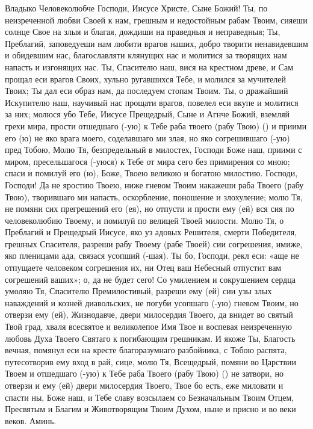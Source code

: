 \begin{mymulticols}
 


Владыко Человеколюбче Господи, Иисусе Христе, Сыне Божий! Ты, по неизреченной любви Своей к нам, грешным и недостойным рабам Твоим, сияеши солнце Свое на злыя и благая, дождиши на праведныя и неправедныя; Ты, Преблагий, заповедуеши нам любити врагов наших, добро творити ненавидевшим и обидевшим нас, благославляти клянущих нас и молитися за творящих нам напасть и изгонящих нас. Ты, Спасителю наш, вися на крестном древе, и Сам прощал еси врагов Своих, хульно ругавшихся Тебе, и молился за мучителей Твоих; Ты дал еси образ нам, да последуем стопам Твоим. Ты, о дражайший Искупителю наш, научивый нас прощати врагов, повелел еси вкупе и молитися за них; молюся убо Тебе, Иисусе Прещедрый, Сыне и Агнче Божий, вземляй грехи мира, прости отшедшаго (-ую) к Тебе раба твоего (рабу Твою) () и приими его (ю) не яко врага моего, соделавшаго ми злая, но яко согрешившаго (-ую) пред Тобою, Молю Тя, безпредельный в милостех, Господи Боже наш, приими с миром, пресельшагося (-уюся) к Тебе от мира сего без примирения со мною; спаси и помилуй его (ю), Боже, Твоею великою и богатою милостию. Господи, Господи! Да не яростию Твоею, ниже гневом Твоим накажеши раба Твоего (рабу Твою), творившаго ми напасть, оскорбление, поношение и злохуление; молю Тя, не помяни сих прегрешений его (ея), но отпусти и прости ему (ей) вся сия по человеколюбию Твоему, и помилуй по велицей Твоей милости. Молю Тя, о Преблагий и Прещедрый Иисусе, яко уз адовых Решителя, смерти Победителя, грешных Спасителя, разреши рабу Твоему (рабе Твоей) сии согрешения, имиже, яко пленицами ада, связася усопший (-шая). Ты бо, Господи, рекл еси: «аще не отпущаете человеком согрешения их, ни Отец ваш Небесный отпустит вам согрешений ваших»; о, да не будет сего! Со умилением и сокрушением сердца умоляю Тя, Спасителю Премилостивый, разреши ему (ей) сии узы злых наваждений и козней диавольских, не погуби усопшаго (-ую) гневом Твоим, но отверзи ему (ей), Жизнодавче, двери милосердия Твоего, да внидет во святый Твой град, хваля всесвятое и великолепое Имя Твое и воспевая неизреченную любовь Духа Твоего Святаго к погибающим грешникам. И якоже Ты, Благость вечная, помянул еси на кресте благоразумнаго разбойника, с Тобою распята, путесотворив ему вход в рай, сице, молю Тя, Всещедрый, помяни во Царствии Твоем и отшедшаго (-ую) к Тебе раба Твоего (рабу Твою) () не затвори, но отверзи и ему (ей) двери милосердия Твоего, Твое бо есть, еже миловати и спасти ны, Боже наш, и Тебе славу возсылаем со Безначальным Твоим Отцем, Пресвятым и Благим и Животворящим Твоим Духом, ныне и присно и во веки веков. Аминь. 

\end{mymulticols}

